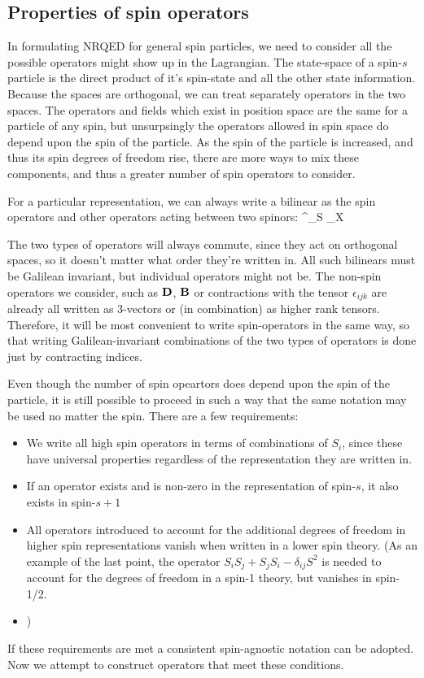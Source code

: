 \subsection{Properties of spin operators}
In formulating NRQED for general spin particles, we need to consider all the possible operators might show up in the Lagrangian.  The state-space of a spin-$s$ particle is the direct product of it's spin-state and all the other state information.  Because the spaces are orthogonal, we can treat separately operators in the two spaces.  The operators and fields which exist in position space are the same for a particle of any spin, but unsurpsingly the operators allowed in spin space do depend upon the spin of the particle.  As the spin of the particle is increased, and thus its spin degrees of freedom rise, there are more ways to mix these components, and thus a greater number of spin operators to consider.

For a particular representation, we can always write a bilinear as the spin operators and other operators acting between two spinors:
\beq
	\Psi^\dagger {}_S _X \Psi
\eeq

The two types of operators will always commute, since they act on orthogonal spaces, so it doesn't matter what order they're written in.  All such bilinears must be Galilean invariant, but individual operators might not be.  The non-spin operators we consider, such as $\mathbf{D}$, $\mathbf{B}$ or contractions with the tensor $\epsilon_{ijk}$ are already all written as 3-vectors or (in combination) as higher rank tensors.  Therefore, it will be most convenient to write spin-operators in the same way, so that writing Galilean-invariant combinations of the two types of operators is done just by contracting indices. 

Even though the number of spin opeartors does depend upon the spin of the particle, it is still possible to proceed in such a way that the same notation may be used no matter the spin.  There are a few requirements:
\begin{itemize}
  \item We write all high spin operators in terms of combinations of $S_i$, since these have universal properties regardless of the representation they are written in.
  \item If an operator exists and is non-zero in the representation of spin-$s$, it also exists in spin-$s+1$
  \item All operators introduced to account for the additional degrees of freedom in higher spin representations vanish when written in a lower spin theory.  (As an example of the last point, the operator $S_i S_j + S_j S_i - \delta_{ij} S^2$ is needed to account for the degrees of freedom in a spin-1 theory, but vanishes in spin-1/2.
  \item )
\end{itemize}
If these requirements are met a consistent spin-agnostic notation can be adopted.  Now we attempt to construct operators that meet these conditions.

